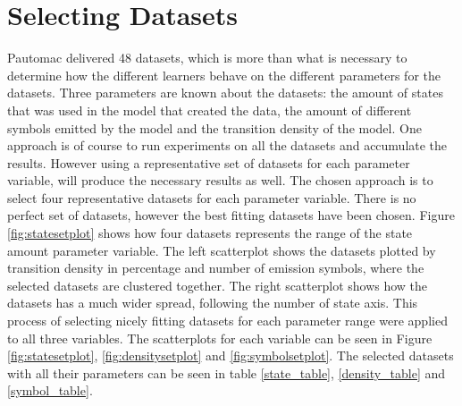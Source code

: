 \section{Selecting Datasets}
Pautomac delivered 48 datasets, which is more than what is necessary to determine how the different learners behave on the different parameters for the datasets. Three parameters are known about the datasets: the amount of states that was used in the model that created the data, the amount of different symbols emitted by the model and the transition density of the model. One approach is of course to run experiments on all the datasets and accumulate the results. However using a representative set of datasets for each parameter variable, will produce the necessary results as well. The chosen approach is to select four representative datasets for each parameter variable. There is no perfect set of datasets, however the best fitting datasets have been chosen.
Figure \ref{fig:statesetplot} shows how four datasets represents the range of the state amount parameter variable. The left scatterplot shows the datasets plotted by transition density in percentage and number of emission symbols, where the selected datasets are clustered together. The right scatterplot shows how the datasets has a much wider spread, following the number of state axis. This process of selecting nicely fitting datasets for each parameter range were applied to all three variables. The scatterplots for each variable can be seen in Figure \ref{fig:statesetplot}, \ref{fig:densitysetplot} and \ref{fig:symbolsetplot}. The  selected datasets with all their parameters can be seen in table \ref{state_table}, \ref{density_table} and \ref{symbol_table}.

